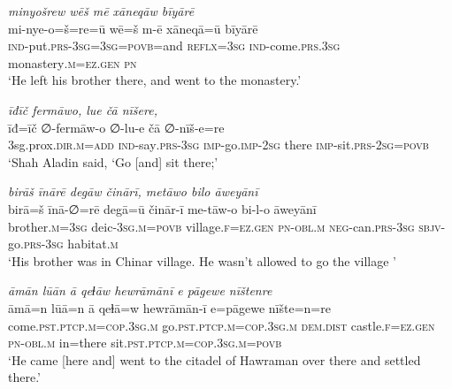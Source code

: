 \ea \label{DG.32}
\textit{minyošrew wēš mē xāneqāw bīyārē} \\ 
\gll mi-nye-o=š=re=ū wē=š m-ē xāneqā=ū bīyārē \\ 
 \textsc{ind-}put\textsc{.prs}\textsc{-3sg}\textsc{=3sg}\textsc{=\textsc{povb}}=and \textsc{reflx}\textsc{=3sg} \textsc{ind-}come\textsc{.prs}\textsc{.3sg} monastery\textsc{.m}\textsc{=ez}\textsc{.gen} \textsc{pn} \\ 
\glt `He left his brother there, and went to the monastery.'
\z 
 
\ea \label{DG.44}
\textit{īđīč fermāwo, lue čā nīšere,} \\ 
\gll īđ=īč ∅-fermāw-o ∅-lu-e čā ∅-nīš-e=re \\ 
 3sg.prox\textsc{.dir}\textsc{.m}\textsc{=add} \textsc{ind-}say\textsc{.prs}\textsc{-3sg} \textsc{imp-}go.\textsc{imp-}\textsc{2sg} there \textsc{imp-}sit\textsc{.prs}-\textsc{2sg}\textsc{=\textsc{povb}} \\ 
\glt `Shah Aladin  said, ‘Go [and] sit there;'
\z 
 
\ea \label{DG.54}
\textit{birāš īnārē degāw činārī, metāwo bilo āweyānī} \\ 
\gll birā=š īnā-∅=rē degā=ū činār-ī me-tāw-o bi-l-o āweyānī \\ 
 brother\textsc{.m}\textsc{=3sg} deic\textsc{-3sg}\textsc{.m}\textsc{=\textsc{povb}} village\textsc{\textsc{.f}}\textsc{=ez}\textsc{.gen} \textsc{pn}\textsc{-obl}\textsc{.m} \textsc{neg-}can\textsc{.prs}\textsc{-3sg} \textsc{sbjv-}go\textsc{.prs}\textsc{-3sg} habitat\textsc{\textsc{.m}} \\ 
\glt `His brother was in Chinar village. He wasn’t allowed to go the village '
\z 
 
\ea \label{DP.9}
\textit{āmān lūān ā qeɫāw hewrāmānī e pāgewe nīštenre} \\ 
\gll āmā=n lūā=n ā qeɫā=w hewrāmān-ī e=pāgewe nīšte=n=re \\ 
 come\textsc{.pst}\textsc{.ptcp}\textsc{.m}\textsc{=cop}\textsc{.3sg}\textsc{.m} go\textsc{.pst}\textsc{.ptcp}\textsc{.m}\textsc{=cop}\textsc{.3sg}\textsc{.m} \textsc{dem.dist} castle\textsc{\textsc{.f}}\textsc{=ez}\textsc{.gen} \textsc{pn}\textsc{-obl}\textsc{.m} in=there sit\textsc{.pst}\textsc{.ptcp}\textsc{.m}\textsc{=cop}\textsc{.3sg}\textsc{.m}\textsc{=\textsc{povb}} \\ 
\glt `He came [here and] went to the citadel of Hawraman over there and settled there.'
\z 
 
